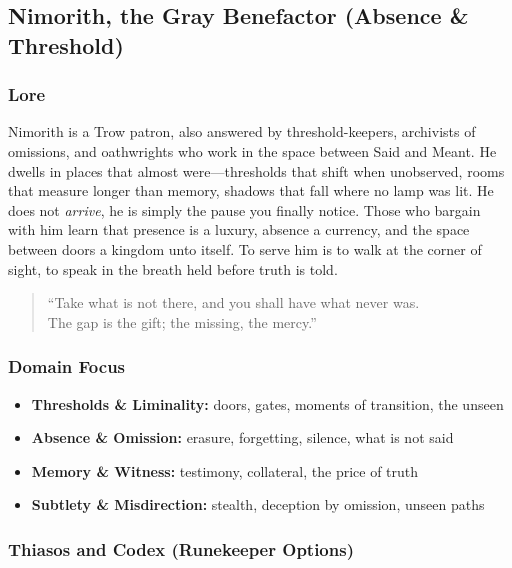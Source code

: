 
\subsection{Nimorith, the Gray Benefactor (Absence \& Threshold)}

\subsubsection*{Lore}
Nimorith is a Trow patron, also answered by threshold-keepers, archivists of omissions, and oathwrights who work in the space between Said and Meant. He dwells in places that almost were---thresholds that shift when unobserved, rooms that measure longer than memory, shadows that fall where no lamp was lit. He does not \emph{arrive}, he is simply the pause you finally notice. Those who bargain with him learn that presence is a luxury, absence a currency, and the space between doors a kingdom unto itself. To serve him is to walk at the corner of sight, to speak in the breath held before truth is told.

\begin{quote}
``Take what is not there, and you shall have what never was. \\
The gap is the gift; the missing, the mercy.''
\end{quote}

\subsubsection*{Domain Focus}
\begin{itemize}
  \item \textbf{Thresholds \& Liminality:} doors, gates, moments of transition, the unseen
  \item \textbf{Absence \& Omission:} erasure, forgetting, silence, what is not said
  \item \textbf{Memory \& Witness:} testimony, collateral, the price of truth
  \item \textbf{Subtlety \& Misdirection:} stealth, deception by omission, unseen paths
\end{itemize}

\subsubsection*{Thiasos and Codex (Runekeeper Options)}

